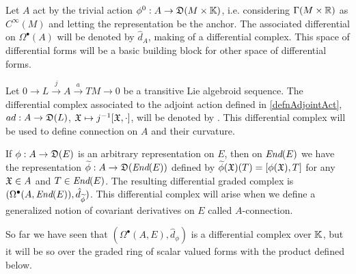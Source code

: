 \begin{example}\label{exampleScalarValuedFormsOnAUpToDifferential}
Let $A$ act by the trivial action $\phi^0: A \to \alg D(M \times \bb K)$, i.e. considering $\Gamma(M \times \mathbb{R})$ as $C^\infty(M)$ and letting the representation be the anchor. The associated differential on $\Omega^\bullet(A)$ will be denoted by $\hat d_A$, making of  a differential complex. This space of differential forms will be a basic building block for other space of differential forms.
\end{example}

\begin{example}\label{exampleLValuedFormsonTransitiveAUpToDifferential}
Let $0 \to L \xrightarrow{j} A \xrightarrow{a} TM \to 0$ be a transitive Lie algebroid sequence.
The differential complex associated to the adjoint action defined in \ref{defnAdjointAct}, $ad: A \to \mathfrak{D}(L)$, $\mathfrak{X} \mapsto j^{-1}[\mathfrak{X}, \cdot]$, will be denoted by .
This differential complex will be used to define connection on $A$ and their curvature.
\end{example}


\begin{example}\label{exampleEndEValuedFormsOnTRAnsitiveUpToDifferential}
If $\phi: A \to \alg D(E)$ is an arbitrary representation on $E$, then on $\operatorname{\textit{End}}(E)$ we have the representation $\tilde \phi: A \to \alg D(\End(E))$ defined by $\tilde \phi(\oid X)(T) = [\phi(\oid X), T]$ for any $\mathfrak{X} \in A$ and $T \in \operatorname{\textit{End}}(E)$. 
The resulting differential graded complex is $(\Omega^\bullet(A, \End(E)), \hat d_{\tilde \phi})$. This differential complex will arise when we define a generalized notion of covariant derivatives on $E$ called $A$-connection.
\end{example}

\linea

So far we have seen that $(\Omega^\bullet(A, E), \hat d_\phi)$ is a differential complex over $\mathbb{K}$, but it will be so over the graded ring of scalar valued forms with the product defined below.

